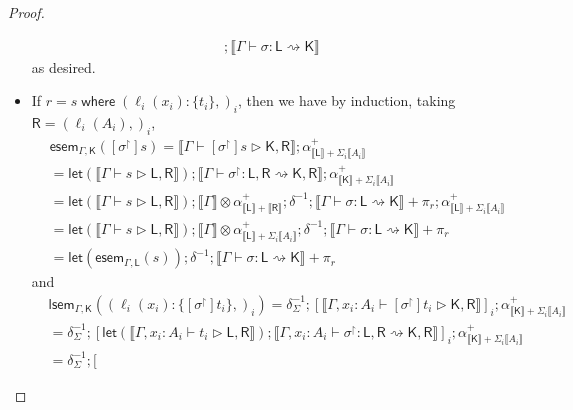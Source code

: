\documentclass[acmsmall,screen,review]{acmart}
\newcommand{\ms}[1]{\ensuremath{\mathsf{#1}}}
\newcommand{\lto}{:}
\newcommand{\where}[2]{#1\;\ms{where}\;#2}
\newcommand{\wbranch}[3]{#1(#2) \lto \{#3\}}
\newcommand{\rupg}[1]{{#1}^\upharpoonright}
\newcommand{\bhyp}[2]{#1 : #2}
\newcommand{\haslb}[3]{#1 \vdash #2 \rhd #3}
\newcommand{\lbsubst}[4]{#1 \vdash #2: #3 \rightsquigarrow #4}
\newcommand{\dnt}[1]{\llbracket{#1}\rrbracket}
\newcommand{\entrymor}[3]{\ms{esem}_{#1, #3}(#2)}
\newcommand{\loopmor}[3]{\ms{lsem}_{#1, #3}(#2)}
\newcommand{\lmor}[1]{\ms{let}(#1)}
\begin{document}
\begin{proof}
\begin{itemize}[leftmargin=*]
\begin{equation}
\begin{aligned}
          ; \dnt{\lbsubst{\Gamma}{\sigma}{\ms{L}}{\ms{K}}}
      \end{aligned}
    \end{equation}
    as desired.
    \item If $r = \where{s}{(\wbranch{\ell_i}{x_i}{t_i},)_i}$, then we have by induction,
    taking $\ms{R} = (\ell_i(A_i),)_i$,
    \begin{equation}
      \begin{aligned}
        & \entrymor{\Gamma}{[\rupg{\sigma}]s}{\ms{K}} 
          = \dnt{\haslb{\Gamma}{[\rupg{\sigma}]s}{\ms{K}, \ms{R}}}
          ; \alpha^+_{\dnt{\ms{L}} + \Sigma_i \dnt{A_i}} \\
        & = \lmor{\dnt{\haslb{\Gamma}{s}{\ms{L}, \ms{R}}}}
          ; \dnt{\lbsubst{\Gamma}{\rupg{\sigma}}{\ms{L}, \ms{R}}{\ms{K}, \ms{R}}}
          ; \alpha^+_{\dnt{\ms{K}} + \Sigma_i \dnt{A_i}} \\
        & = \lmor{\dnt{\haslb{\Gamma}{s}{\ms{L}, \ms{R}}}}
          ; \dnt{\Gamma} \otimes \alpha^+_{\dnt{\ms{L}} + \dnt{\ms{R}}} ; \delta^{-1} 
          ; \dnt{\lbsubst{\Gamma}{\sigma}{\ms{L}}{\ms{K}}} + \pi_r
          ; \alpha^+_{\dnt{\ms{L}} + \Sigma_i \dnt{A_i}} \\
        & = \lmor{\dnt{\haslb{\Gamma}{s}{\ms{L}, \ms{R}}}}
          ; \dnt{\Gamma} \otimes \alpha^+_{\dnt{\ms{L}} + \Sigma_i \dnt{A_i}} ; \delta^{-1} 
          ; \dnt{\lbsubst{\Gamma}{\sigma}{\ms{L}}{\ms{K}}} + \pi_r\\
        & = \lmor{\entrymor{\Gamma}{s}{\ms{L}}} 
          ; \delta^{-1} ; \dnt{\lbsubst{\Gamma}{\sigma}{\ms{L}}{\ms{K}}} + \pi_r
      \end{aligned}
    \end{equation}
    and
    \begin{equation}
      \begin{aligned}       
        & \loopmor{\Gamma}{(\wbranch{\ell_i}{x_i}{[\rupg{\sigma}]t_i},)_i}{\ms{K}} 
          = \delta^{-1}_{\Sigma} 
          ; [ \dnt{\haslb{\Gamma, \bhyp{x_i}{A_i}}{[\rupg{\sigma}]t_i}{\ms{K}, \ms{R}}} ]_i
          ; \alpha^+_{\dnt{\ms{K}} + \Sigma_i \dnt{A_i}} \\
        & = \delta^{-1}_{\Sigma} 
        ; [ 
            \lmor{\dnt{\haslb{\Gamma, \bhyp{x_i}{A_i}}{t_i}{\ms{L}, \ms{R}}}} 
            ; \dnt{\lbsubst{\Gamma, \bhyp{x_i}{A_i}}{\rupg{\sigma}}{\ms{L}, \ms{R}}{\ms{K}, \ms{R}}}
          ]_i
        ; \alpha^+_{\dnt{\ms{K}} + \Sigma_i \dnt{A_i}} \\
        & = \delta^{-1}_{\Sigma} 
        ; [ 

\end{aligned}
\end{equation}
\end{itemize}
\end{proof}
\end{document}

